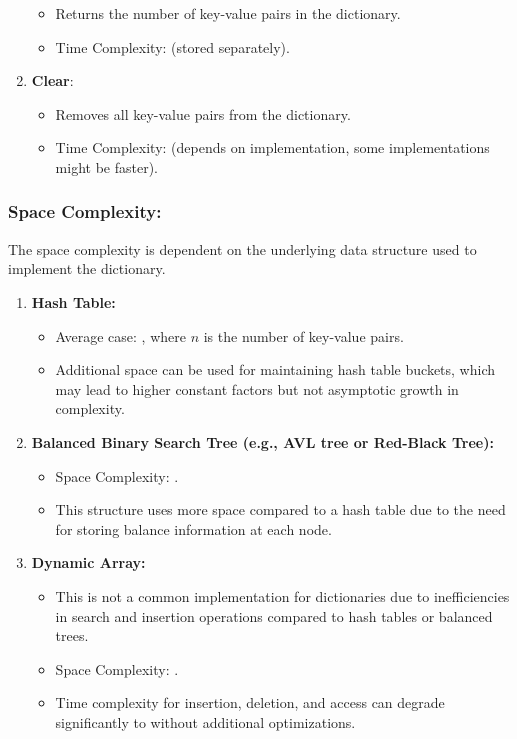 \begin{enumerate}
          \begin{itemize}
              \item Returns the number of key-value pairs in the dictionary.
              \item Time Complexity:  (stored separately).
          \end{itemize}
    \item \textbf{Clear}:
          \begin{itemize}
              \item Removes all key-value pairs from the dictionary.
              \item Time Complexity:  (depends on implementation, some implementations might be faster).
          \end{itemize}
\end{enumerate}

\subsubsection{Space Complexity:}

The space complexity is dependent on the underlying data structure used
to implement the dictionary.

\begin{enumerate}
    \item \textbf{Hash Table:}
          \begin{itemize}
              \item Average case: , where $n$ is the number of key-value pairs.
              \item Additional space can be used for maintaining hash table buckets, which may lead to higher constant factors but not asymptotic growth in complexity.
          \end{itemize}
    \item \textbf{Balanced Binary Search Tree (e.g., AVL tree or Red-Black Tree):}
          \begin{itemize}
              \item Space Complexity: .
              \item This structure uses more space compared to a hash table due to the need for storing balance information at each node.
          \end{itemize}
    \item \textbf{Dynamic Array:}
          \begin{itemize}
              \item This is not a common implementation for dictionaries due to inefficiencies in search and insertion operations compared to hash tables or balanced trees.
              \item Space Complexity: .
              \item Time complexity for insertion, deletion, and access can degrade significantly to  without additional optimizations.
          \end{itemize}
\end{enumerate}


